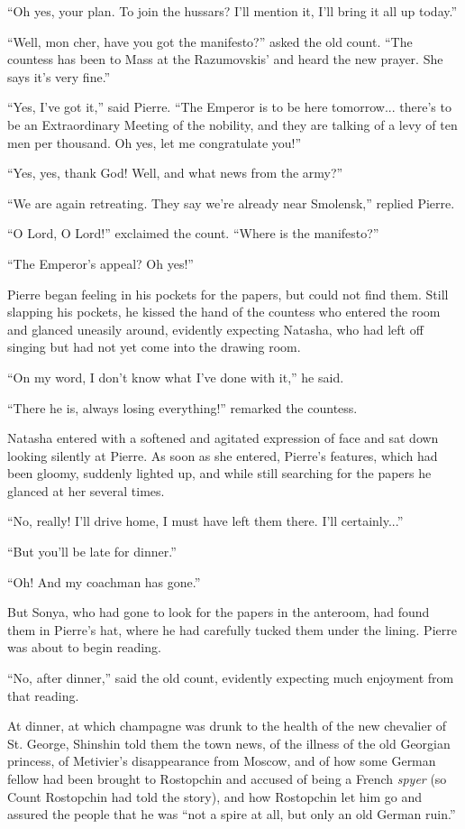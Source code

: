 ``Oh yes, your plan. To join the hussars? I'll mention it, I'll
bring it all up today.''

``Well, mon cher, have you got the manifesto?'' asked the old
count. ``The countess has been to Mass at the Razumovskis' and
heard the new prayer.  She says it's very fine.''

``Yes, I've got it,'' said Pierre. ``The Emperor is to be here
tomorrow...  there's to be an Extraordinary Meeting of the
nobility, and they are talking of a levy of ten men per
thousand. Oh yes, let me congratulate you!''

``Yes, yes, thank God! Well, and what news from the army?''

``We are again retreating. They say we're already near
Smolensk,'' replied Pierre.

``O Lord, O Lord!'' exclaimed the count. ``Where is the
manifesto?''

``The Emperor's appeal? Oh yes!''

Pierre began feeling in his pockets for the papers, but could not
find them. Still slapping his pockets, he kissed the hand of the
countess who entered the room and glanced uneasily around,
evidently expecting Natasha, who had left off singing but had not
yet come into the drawing room.

``On my word, I don't know what I've done with it,'' he said.

``There he is, always losing everything!'' remarked the countess.

Natasha entered with a softened and agitated expression of face
and sat down looking silently at Pierre. As soon as she entered,
Pierre's features, which had been gloomy, suddenly lighted up,
and while still searching for the papers he glanced at her
several times.

``No, really! I'll drive home, I must have left them there. I'll
certainly...''

``But you'll be late for dinner.''

``Oh! And my coachman has gone.''

But Sonya, who had gone to look for the papers in the anteroom,
had found them in Pierre's hat, where he had carefully tucked
them under the lining. Pierre was about to begin reading.

``No, after dinner,'' said the old count, evidently expecting
much enjoyment from that reading.

At dinner, at which champagne was drunk to the health of the new
chevalier of St. George, Shinshin told them the town news, of the
illness of the old Georgian princess, of Metivier's disappearance
from Moscow, and of how some German fellow had been brought to
Rostopchin and accused of being a French \emph{spyer} (so Count
Rostopchin had told the story), and how Rostopchin let him go and
assured the people that he was ``not a spire at all, but only an
old German ruin.''

